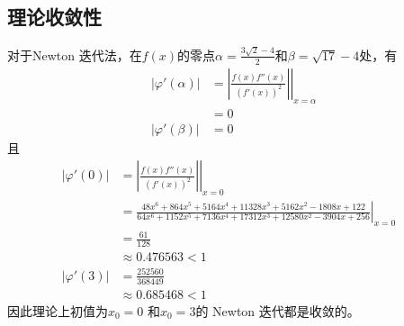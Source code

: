 \documentclass[11pt]{article}
\begin{document}
\subsection{理论收敛性}
对于Newton 迭代法，在$f(x)$的零点$\alpha = \frac{3 \sqrt{2} - 4}{2}$和$\beta = \sqrt{17} - 4处$，有
\begin{align*}
    |\varphi'(\alpha)| & = \left.\left|\frac{f(x)f''(x)}{\left(f'(x)\right)^2}\right|\right|_{x = \alpha} \\
                       & = 0                                                                              \\
    |\varphi'(\beta)|  & =0
\end{align*}
且
\begin{align*}
    |\varphi'(0)| & = \left.\left|\frac{f(x)f''(x)}{\left(f'(x)\right)^2}\right|\right|_{x = 0}                                                                  \\
                  & = \left.\frac{48 x^6+864 x^5+5164 x^4+11328 x^3+5162 x^2-1808 x+122}{64 x^6+1152 x^5+7136 x^4+17312 x^3+12580 x^2-3904 x+256}\right|_{x = 0} \\
                  & = \frac{61}{128}                                                                                                                             \\
                  & \approx 0.476563 < 1
                  &                                                                                                                                              \\
    |\varphi'(3)| & = \frac{252560}{368449}                                                                                                                      \\
                  & \approx 0.685468 < 1
\end{align*}
因此理论上初值为$x_0 = 0$ 和$x_0 = 3$的 Newton 迭代都是收敛的。
\end{document}
